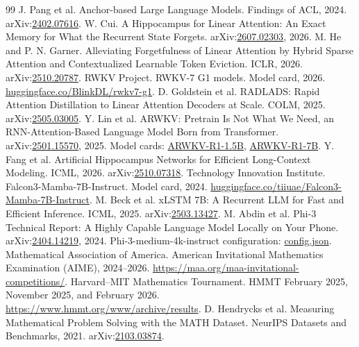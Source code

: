 \begin{thebibliography}{99}
 J. Pang et al. Anchor-based Large Language Models. Findings of ACL, 2024. arXiv:\href{https://arxiv.org/abs/2402.07616}{2402.07616}.
 W. Cui. A Hippocampus for Linear Attention: An Exact Memory for What the Recurrent State Forgets. arXiv:\href{https://arxiv.org/abs/2607.02303}{2607.02303}, 2026.
 M. He and P. N. Garner. Alleviating Forgetfulness of Linear Attention by Hybrid Sparse Attention and Contextualized Learnable Token Eviction. ICLR, 2026. arXiv:\href{https://arxiv.org/abs/2510.20787}{2510.20787}.
 RWKV Project. RWKV-7 G1 models. Model card, 2026. \href{https://huggingface.co/BlinkDL/rwkv7-g1}{huggingface.co/BlinkDL/rwkv7-g1}.
 D. Goldstein et al. RADLADS: Rapid Attention Distillation to Linear Attention Decoders at Scale. COLM, 2025. arXiv:\href{https://arxiv.org/abs/2505.03005}{2505.03005}.
 Y. Lin et al. ARWKV: Pretrain Is Not What We Need, an RNN-Attention-Based Language Model Born from Transformer. arXiv:\href{https://arxiv.org/abs/2501.15570}{2501.15570}, 2025. Model cards: \href{https://huggingface.co/RWKV-Red-Team/ARWKV-R1-1B5}{ARWKV-R1-1.5B}, \href{https://huggingface.co/RWKV-Red-Team/ARWKV-R1-7B}{ARWKV-R1-7B}.
 Y. Fang et al. Artificial Hippocampus Networks for Efficient Long-Context Modeling. ICML, 2026. arXiv:\href{https://arxiv.org/abs/2510.07318}{2510.07318}.
 Technology Innovation Institute. Falcon3-Mamba-7B-Instruct. Model card, 2024. \href{https://huggingface.co/tiiuae/Falcon3-Mamba-7B-Instruct}{huggingface.co/tiiuae/Falcon3-Mamba-7B-Instruct}.
 M. Beck et al. xLSTM 7B: A Recurrent LLM for Fast and Efficient Inference. ICML, 2025. arXiv:\href{https://arxiv.org/abs/2503.13427}{2503.13427}.
 M. Abdin et al. Phi-3 Technical Report: A Highly Capable Language Model Locally on Your Phone. arXiv:\href{https://arxiv.org/abs/2404.14219}{2404.14219}, 2024. Phi-3-medium-4k-instruct configuration: \href{https://huggingface.co/microsoft/Phi-3-medium-4k-instruct/blob/main/config.json}{config.json}.
 Mathematical Association of America. American Invitational Mathematics Examination (AIME), 2024--2026. \url{https://maa.org/maa-invitational-competitions/}.
 Harvard--MIT Mathematics Tournament. HMMT February 2025, November 2025, and February 2026. \url{https://www.hmmt.org/www/archive/results}.
 D. Hendrycks et al. Measuring Mathematical Problem Solving with the MATH Dataset. NeurIPS Datasets and Benchmarks, 2021. arXiv:\href{https://arxiv.org/abs/2103.03874}{2103.03874}.

\end{thebibliography}

